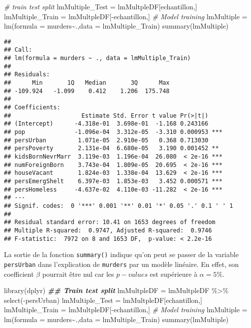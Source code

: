 \documentclass[
]{book}
\newenvironment{Shaded}{\begin{snugshade}}{\end{snugshade}}
\newcommand{\AttributeTok}[1]{\textcolor[rgb]{0.77,0.63,0.00}{#1}}
\newcommand{\CommentTok}[1]{\textcolor[rgb]{0.56,0.35,0.01}{\textit{#1}}}
\newcommand{\DocumentationTok}[1]{\textcolor[rgb]{0.56,0.35,0.01}{\textbf{\textit{#1}}}}
\newcommand{\FunctionTok}[1]{\textcolor[rgb]{0.00,0.00,0.00}{#1}}
\newcommand{\NormalTok}[1]{#1}
\newcommand{\OtherTok}[1]{\textcolor[rgb]{0.56,0.35,0.01}{#1}}
\newcommand{\SpecialCharTok}[1]{\textcolor[rgb]{0.00,0.00,0.00}{#1}}
\begin{document}
\begin{Shaded}
\begin{Highlighting}[]
\CommentTok{\# train test split}
\NormalTok{lmMultiple\_Test }\OtherTok{=}\NormalTok{ lmMultpleDF[echantillon,]}
\NormalTok{lmMultiple\_Train }\OtherTok{=}\NormalTok{ lmMultpleDF[}\SpecialCharTok{{-}}\NormalTok{echantillon,]}
\CommentTok{\# Model training}
\NormalTok{lmMultiple }\OtherTok{=} \FunctionTok{lm}\NormalTok{(}\AttributeTok{formula =}\NormalTok{  murders}\SpecialCharTok{\textasciitilde{}}\NormalTok{.,}\AttributeTok{data =}\NormalTok{ lmMultiple\_Train)}
\FunctionTok{summary}\NormalTok{(lmMultiple)}
\end{Highlighting}
\end{Shaded}

\begin{verbatim}
## 
## Call:
## lm(formula = murders ~ ., data = lmMultiple_Train)
## 
## Residuals:
##      Min       1Q   Median       3Q      Max 
## -109.924   -1.099    0.412    1.206  175.748 
## 
## Coefficients:
##                    Estimate Std. Error t value Pr(>|t|)    
## (Intercept)      -4.318e-01  3.698e-01  -1.168 0.243166    
## pop              -1.096e-04  3.312e-05  -3.310 0.000953 ***
## persUrban         1.071e-05  2.910e-05   0.368 0.713030    
## persPoverty       2.131e-04  6.680e-05   3.190 0.001452 ** 
## kidsBornNevrMarr  3.119e-03  1.196e-04  26.080  < 2e-16 ***
## numForeignBorn    3.743e-04  1.809e-05  20.695  < 2e-16 ***
## houseVacant       1.824e-03  1.338e-04  13.629  < 2e-16 ***
## persEmergShelt    6.397e-03  1.853e-03   3.452 0.000571 ***
## persHomeless     -4.637e-02  4.110e-03 -11.282  < 2e-16 ***
## ---
## Signif. codes:  0 '***' 0.001 '**' 0.01 '*' 0.05 '.' 0.1 ' ' 1
## 
## Residual standard error: 10.41 on 1653 degrees of freedom
## Multiple R-squared:  0.9747, Adjusted R-squared:  0.9746 
## F-statistic:  7972 on 8 and 1653 DF,  p-value: < 2.2e-16
\end{verbatim}

La sortie de la fonction \texttt{summary()} indique qu'on peut se passer de la variable \texttt{persUrban} dans l'explication de \texttt{murders} par un modèle linéaire. En effet, son coefficient \(\beta\) pourrait être nul car les \(p-values\) est supérieure à \(\alpha=5\%\).\\

\begin{Shaded}
\begin{Highlighting}[]
\FunctionTok{library}\NormalTok{(dplyr)}
\DocumentationTok{\#\# Train test split}
\NormalTok{lmMultpleDF }\OtherTok{=}\NormalTok{ lmMultpleDF }\SpecialCharTok{\%\textgreater{}\%} \FunctionTok{select}\NormalTok{(}\SpecialCharTok{{-}}\NormalTok{persUrban)}
\NormalTok{lmMultiple\_Test }\OtherTok{=}\NormalTok{ lmMultpleDF[echantillon,]}
\NormalTok{lmMultiple\_Train }\OtherTok{=}\NormalTok{ lmMultpleDF[}\SpecialCharTok{{-}}\NormalTok{echantillon,]}
\CommentTok{\# Model training}
\NormalTok{lmMultiple }\OtherTok{=} \FunctionTok{lm}\NormalTok{(}\AttributeTok{formula =}\NormalTok{  murders}\SpecialCharTok{\textasciitilde{}}\NormalTok{.,}\AttributeTok{data =}\NormalTok{ lmMultiple\_Train)}
\FunctionTok{summary}\NormalTok{(lmMultiple)}
\end{Highlighting}
\end{Shaded}
\end{document}

